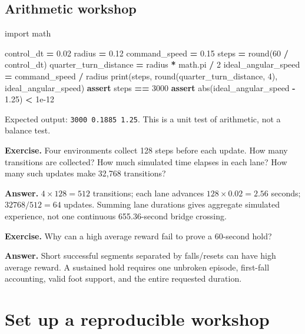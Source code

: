 \documentclass[
  american,
  11pt,
  letterpaper,
]{article}
\newenvironment{Shaded}{\begin{snugshade}}{\end{snugshade}}
\newcommand{\BuiltInTok}[1]{#1}
\newcommand{\ControlFlowTok}[1]{\textcolor[rgb]{0.13,0.29,0.53}{\textbf{#1}}}
\newcommand{\DecValTok}[1]{\textcolor[rgb]{0.00,0.00,0.81}{#1}}
\newcommand{\FloatTok}[1]{\textcolor[rgb]{0.00,0.00,0.81}{#1}}
\newcommand{\ImportTok}[1]{#1}
\newcommand{\NormalTok}[1]{#1}
\newcommand{\OperatorTok}[1]{\textcolor[rgb]{0.81,0.36,0.00}{\textbf{#1}}}
\renewenvironment{Shaded}{\par\smallskip}{\par\smallskip}
\begin{document}
\subsection{Arithmetic workshop}\label{arithmetic-workshop}

\begin{Shaded}
\begin{Highlighting}[]
\ImportTok{import}\NormalTok{ math}

\NormalTok{control\_dt }\OperatorTok{=} \FloatTok{0.02}
\NormalTok{radius }\OperatorTok{=} \FloatTok{0.12}
\NormalTok{command\_speed }\OperatorTok{=} \FloatTok{0.15}
\NormalTok{steps }\OperatorTok{=} \BuiltInTok{round}\NormalTok{(}\DecValTok{60} \OperatorTok{/}\NormalTok{ control\_dt)}
\NormalTok{quarter\_turn\_distance }\OperatorTok{=}\NormalTok{ radius }\OperatorTok{*}\NormalTok{ math.pi }\OperatorTok{/} \DecValTok{2}
\NormalTok{ideal\_angular\_speed }\OperatorTok{=}\NormalTok{ command\_speed }\OperatorTok{/}\NormalTok{ radius}
\BuiltInTok{print}\NormalTok{(steps, }\BuiltInTok{round}\NormalTok{(quarter\_turn\_distance, }\DecValTok{4}\NormalTok{), ideal\_angular\_speed)}
\ControlFlowTok{assert}\NormalTok{ steps }\OperatorTok{==} \DecValTok{3000}
\ControlFlowTok{assert} \BuiltInTok{abs}\NormalTok{(ideal\_angular\_speed }\OperatorTok{{-}} \FloatTok{1.25}\NormalTok{) }\OperatorTok{\textless{}} \FloatTok{1e{-}12}
\end{Highlighting}
\end{Shaded}

Expected output: \texttt{3000\ 0.1885\ 1.25}. This is a unit test of
arithmetic, not a balance test.

\textbf{Exercise.} Four environments collect 128 steps before each
update. How many transitions are collected? How much simulated time
elapses in each lane? How many such updates make 32,768 transitions?

\textbf{Answer.} \(4\times128=512\) transitions; each lane advances
\(128\times0.02=2.56\) seconds; \(32768/512=64\) updates. Summing lane
durations gives aggregate simulated experience, not one continuous
655.36-second bridge crossing.

\textbf{Exercise.} Why can a high average reward fail to prove a
60-second hold?

\textbf{Answer.} Short successful segments separated by falls/resets can
have high average reward. A sustained hold requires one unbroken
episode, first-fall accounting, valid foot support, and the entire
requested duration.

\section{Set up a reproducible
workshop}\label{set-up-a-reproducible-workshop}
\end{document}
